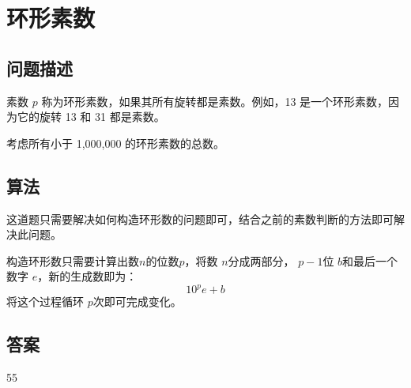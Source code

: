 \section{环形素数}
\subsection{问题描述}
\begin{tcolorbox}

素数 \( p \) 称为环形素数，如果其所有旋转都是素数。例如，13 是一个环形素数，因为它的旋转 13 和 31 都是素数。

考虑所有小于 1,000,000 的环形素数的总数。
\end{tcolorbox}

\subsection{算法}
这道题只需要解决如何构造环形数的问题即可，结合之前的素数判断的方法即可解决此问题。

构造环形数只需要计算出数$n$的位数$p$，将数 \( n \)分成两部分， \( p - 1 \)位 \( b \)和最后一个数字 \( e \)，新的生成数即为：
\begin{equation*}
 10^pe + b
\end{equation*}
将这个过程循环 \( p \)次即可完成变化。


\subsection{答案}
55
